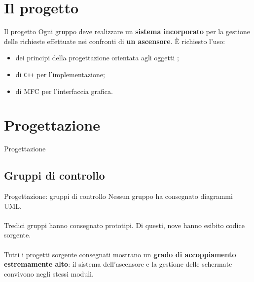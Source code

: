 \documentclass{beamer}
\begin{document}
\section{Il progetto}
\begin{frame}{Il progetto}
	Ogni gruppo deve realizzare un \textbf{sistema incorporato} per la gestione
	delle richieste effettuate nei confronti di \textbf{un ascensore}. È richiesto
	l'uso:
	\begin{itemize}
		\item dei principi della progettazione orientata agli oggetti
		      ;
		\item di \texttt{C++} per l'implementazione;
		\item di MFC per l'interfaccia grafica.
	\end{itemize}
\end{frame}

\section{Progettazione}
\begin{frame}
	\vfill
	\centering
	Progettazione
	\vfill
\end{frame}

\subsection{Gruppi di controllo}
\begin{frame}{Progettazione: gruppi di controllo}
	Nessun gruppo ha consegnato diagrammi UML.
	\\~\\
	Tredici gruppi hanno consegnato prototipi. Di questi, nove hanno esibito
	codice sorgente.
	\\~\\
	Tutti i progetti sorgente consegnati mostrano un \textbf{grado di
		accoppiamento estremamente alto}: il sistema dell'ascensore e la gestione
	delle schermate convivono negli stessi moduli.
\end{frame}
\end{document}
